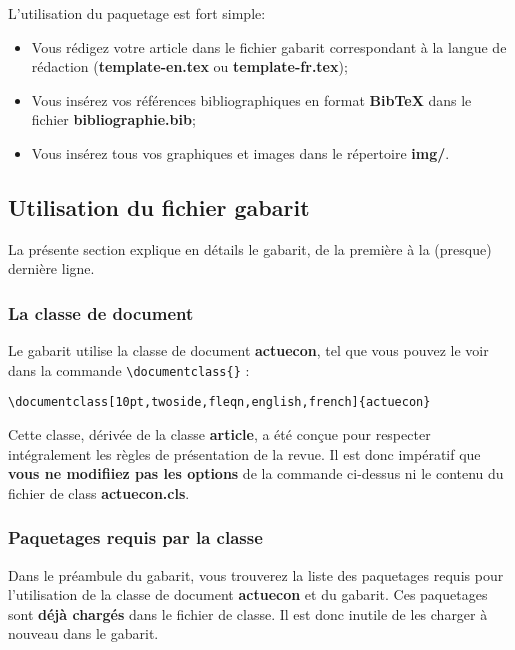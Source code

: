 \documentclass[french]{article}
\newcommand{\cmd}[1]{%
	\texttt{\textbackslash#1\{\}}
}
\begin{document}
			L'utilisation du paquetage est fort simple:
			
			\begin{itemize}
				\item Vous rédigez votre article dans le fichier gabarit correspondant à la langue de rédaction (\textbf{template-en.tex} ou \textbf{template-fr.tex});
				\item Vous insérez vos références bibliographiques en format \textbf{Bib\TeX} dans le fichier \textbf{bibliographie.bib};
				\item Vous insérez tous vos graphiques et images dans le répertoire \textbf{img/}.
			\end{itemize}
	
		\subsection{Utilisation du fichier gabarit}
		
			La présente section explique en détails le gabarit, de la première à la (presque) dernière ligne.
			
			\subsubsection{La classe de document}
			
				Le gabarit utilise la classe de document \textbf{actuecon}, tel que vous pouvez le voir dans la
				commande \cmd{documentclass}:
				
				\begin{shaded*}
					\verb|\documentclass[10pt,twoside,fleqn,english,french]{actuecon}|
				\end{shaded*}
			
				Cette classe, dérivée de la classe \textbf{article}, a été conçue pour respecter intégralement les
				règles de présentation de la revue. Il est donc impératif que \textbf{vous ne modifiiez pas les options} de
				la commande ci-dessus ni le contenu du fichier de class \textbf{actuecon.cls}.
				
			\subsubsection{Paquetages requis par la classe}
			
				Dans le préambule du gabarit, vous trouverez la liste des paquetages requis pour l'utilisation de
				la classe de document \textbf{actuecon} et du gabarit. Ces paquetages sont \textbf{déjà chargés} dans
				le fichier de classe. Il est donc inutile de les charger à nouveau dans le gabarit.
				
\end{document}
